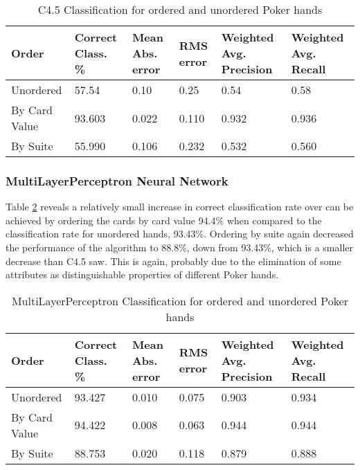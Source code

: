 \documentclass[10pt, a4paper]{article}
\begin{document}
\begin{table}[htbp]
  \centering  
    \begin{tabular}{p{3cm}p{1.5cm}p{1.5cm}p{1.5cm}p{1.5cm}p{1.5cm}}
    \toprule
    \textbf{Order} & Correct Class. \% & Mean Abs. error & RMS error & Weighted Avg. Precision & Weighted Avg. Recall \\
    \midrule
    Unordered & 57.54 & 0.10  & 0.25  & 0.54  & 0.58 \\
    By Card Value & 93.603 & 0.022 & 0.110 & 0.932 & 0.936 \\
    By Suite & 55.990 & 0.106 & 0.232 & 0.532 & 0.560 \\
    \bottomrule
    \end{tabular}%
  \label{tab:addlabel}%
  \caption{C4.5 Classification for ordered and unordered Poker hands}
  \label{tab:dtoresults}%
\end{table}%

\subsubsection*{MultiLayerPerceptron Neural Network}

Table \ref{tab:nnoresults} reveals a relatively small increase in correct classification rate over can be achieved by ordering the cards by card value 94.4\% when compared to the classification rate for unordered hands, 93.43\%. Ordering by suite again decreased the performance of the algorithm to 88.8\%, down from 93.43\%, which is a smaller decrease than C4.5 saw. This is again, probably due to the elimination of some attributes as distinguishable properties of different Poker hands.

\begin{table}[htbp]
  \centering  
    \begin{tabular}{p{3cm}p{1.5cm}p{1.5cm}p{1.5cm}p{1.5cm}p{1.5cm}}
    \toprule
    \textbf{Order} & Correct Class. \% & Mean Abs. error & RMS error & Weighted Avg. Precision & Weighted Avg. Recall \\
    \midrule
    Unordered & 93.427 & 0.010 & 0.075 & 0.903 & 0.934 \\
    By Card Value & 94.422 & 0.008 & 0.063 & 0.944 & 0.944 \\
    By Suite & 88.753 & 0.020 & 0.118 & 0.879 & 0.888 \\
    \bottomrule
    \end{tabular}%

  \caption{MultiLayerPerceptron Classification for ordered and unordered Poker hands}
  \label{tab:nnoresults}%
\end{table}%
\end{document}
